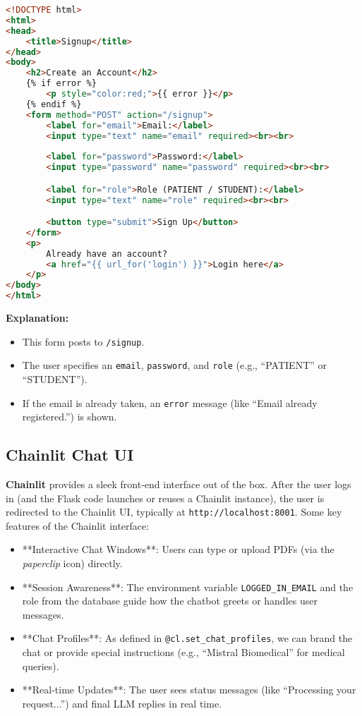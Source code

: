 \begin{lstlisting}[language=HTML, caption={signup.html (Flask Template)}, basicstyle=\small\ttfamily]
<!DOCTYPE html>
<html>
<head>
    <title>Signup</title>
</head>
<body>
    <h2>Create an Account</h2>
    {% if error %}
        <p style="color:red;">{{ error }}</p>
    {% endif %}
    <form method="POST" action="/signup">
        <label for="email">Email:</label>
        <input type="text" name="email" required><br><br>
        
        <label for="password">Password:</label>
        <input type="password" name="password" required><br><br>

        <label for="role">Role (PATIENT / STUDENT):</label>
        <input type="text" name="role" required><br><br>

        <button type="submit">Sign Up</button>
    </form>
    <p>
        Already have an account? 
        <a href="{{ url_for('login') }}">Login here</a>
    </p>
</body>
</html>
\end{lstlisting}

\noindent\textbf{Explanation:}
\begin{itemize}
    \item This form posts to \texttt{/signup}.
    \item The user specifies an \texttt{email}, \texttt{password}, and \texttt{role} (e.g., “PATIENT” or “STUDENT”).
    \item If the email is already taken, an \texttt{error} message (like ``Email already registered.'') is shown.
\end{itemize}

\subsection{Chainlit Chat UI}

\textbf{Chainlit} provides a sleek front-end interface out of the box. After the user logs in (and the Flask code launches or reuses a Chainlit instance), the user is redirected to the Chainlit UI, typically at \texttt{http://localhost:8001}. Some key features of the Chainlit interface:

\begin{itemize}
    \item **Interactive Chat Windows**: Users can type or upload PDFs (via the \emph{paperclip} icon) directly. 
    \item **Session Awareness**: The environment variable \texttt{LOGGED\_IN\_EMAIL} and the role from the database guide how the chatbot greets or handles user messages.
    \item **Chat Profiles**: As defined in \texttt{@cl.set\_chat\_profiles}, we can brand the chat or provide special instructions (e.g., “Mistral Biomedical” for medical queries).
    \item **Real-time Updates**: The user sees status messages (like “Processing your request...”) and final LLM replies in real time.
\end{itemize}

